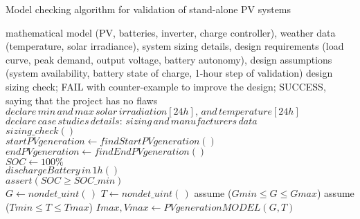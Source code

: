  \begin{algorithm}
 \caption{Model checking algorithm for validation of stand-alone PV systems}
 \begin{algorithmic}[1]
 \begin{scriptsize}
 \renewcommand{\algorithmicrequire}{\textbf{Input:}}
 \renewcommand{\algorithmicensure}{\textbf{Output:}}
 \REQUIRE mathematical model (PV, batteries, inverter, charge controller), weather data (temperature, solar irradiance), system sizing details, design requirements (load curve, peak demand, output voltage, battery autonomy), design assumptions (system availability, battery state of charge, 1-hour step of validation)
 \ENSURE design sizing check; FAIL with counter-example to improve the design; SUCCESS, saying that the project has no flaws
  \STATE $declare \, min \, and \, max \, solar \, irradiation[24h], \, and \, temperature[24h]$\\
  \STATE $declare \, case \, studies \, details: \, sizing \, and \, manufacturers \, data $ \\
  \STATE $sizing \_ check()$ \\
  \STATE $startPVgeneration \leftarrow findStartPVgeneration()$ \\
  \STATE $endPVgeneration \leftarrow findEndPVgeneration()$ \\
  \STATE $SOC \leftarrow 100\%$ \\
	  \STATE $dischargeBattery \, in \, 1h()$ \\
	  \STATE $assert (SOC \geq SOC \_ min)$ \\
  \ENDFOR
    \STATE $G \leftarrow nondet \_ uint(\,)$ 
    \STATE $T \leftarrow nondet \_ uint(\,)$ 
    \STATE assume ($Gmin \leq G \leq Gmax$) 
    \STATE assume ($Tmin \leq T \leq Tmax$) 
    \STATE $Imax, Vmax \leftarrow PVgenerationMODEL (G,T)$ \\

\end{scriptsize}
\end{algorithmic}
\end{algorithm}
